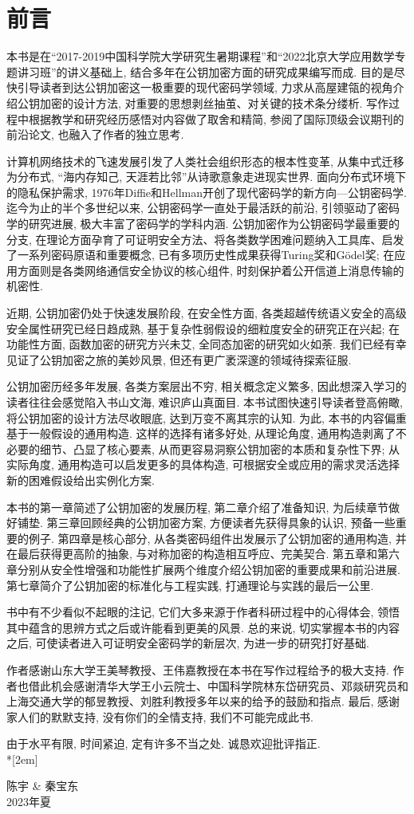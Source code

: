 \chapter{前言}
本书是在``2017-2019中国科学院大学研究生暑期课程''和``2022北京大学应用数学专题讲习班''的讲义基础上, 结合多年在公钥加密方面的研究成果编写而成. 
目的是尽快引导读者到达公钥加密这一极重要的现代密码学领域, 力求从高屋建瓴的视角介绍公钥加密的设计方法, 对重要的思想剥丝抽茧、对关键的技术条分缕析. 
写作过程中根据教学和研究经历感悟对内容做了取舍和精简, 参阅了国际顶级会议期刊的前沿论文, 也融入了作者的独立思考.   

计算机网络技术的飞速发展引发了人类社会组织形态的根本性变革, 从集中式迁移为分布式, ``海内存知己, 天涯若比邻''从诗歌意象走进现实世界. 
面向分布式环境下的隐私保护需求, 1976年Diffie和Hellman开创了现代密码学的新方向—公钥密码学. 
迄今为止的半个多世纪以来, 公钥密码学一直处于最活跃的前沿, 引领驱动了密码学的研究进展, 极大丰富了密码学的学科内涵. 
公钥加密作为公钥密码学最重要的分支, 在理论方面孕育了可证明安全方法、将各类数学困难问题纳入工具库、启发了一系列密码原语和重要概念, 
已有多项历史性成果获得Turing奖和G\"odel奖; 在应用方面则是各类网络通信安全协议的核心组件, 时刻保护着公开信道上消息传输的机密性. 

近期, 公钥加密仍处于快速发展阶段, 在安全性方面, 各类超越传统语义安全的高级安全属性研究已经日趋成熟, 基于复杂性弱假设的细粒度安全的研究正在兴起; 
在功能性方面, 函数加密的研究方兴未艾, 全同态加密的研究如火如荼. 我们已经有幸见证了公钥加密之旅的美妙风景, 但还有更广袤深邃的领域待探索征服. 

公钥加密历经多年发展, 各类方案层出不穷, 相关概念定义繁多, 因此想深入学习的读者往往会感觉陷入书山文海, 难识庐山真面目. 
本书试图快速引导读者登高俯瞰, 将公钥加密的设计方法尽收眼底, 达到万变不离其宗的认知. 
为此, 本书的内容偏重基于一般假设的通用构造. 这样的选择有诸多好处, 从理论角度, 通用构造剥离了不必要的细节、凸显了核心要素, 从而更容易洞察公钥加密的本质和复杂性下界; 
从实际角度, 通用构造可以启发更多的具体构造, 可根据安全或应用的需求灵活选择新的困难假设给出实例化方案. 

本书的第一章简述了公钥加密的发展历程, 第二章介绍了准备知识, 为后续章节做好铺垫. 
第三章回顾经典的公钥加密方案, 方便读者先获得具象的认识, 预备一些重要的例子. 
第四章是核心部分, 从各类密码组件出发展示了公钥加密的通用构造, 并在最后获得更高阶的抽象, 与对称加密的构造相互呼应、完美契合. 
第五章和第六章分别从安全性增强和功能性扩展两个维度介绍公钥加密的重要成果和前沿进展. 
第七章简介了公钥加密的标准化与工程实践, 打通理论与实践的最后一公里. 

书中有不少看似不起眼的注记, 它们大多来源于作者科研过程中的心得体会, 领悟其中蕴含的思辨方式之后或许能看到更美的风景. 
总的来说, 切实掌握本书的内容之后, 可使读者进入可证明安全密码学的新层次, 为进一步的研究打好基础. 

作者感谢山东大学王美琴教授、王伟嘉教授在本书在写作过程给予的极大支持. 
作者也借此机会感谢清华大学王小云院士、中国科学院林东岱研究员、邓燚研究员和上海交通大学的郁昱教授、刘胜利教授多年以来的给予的鼓励和指点. 
最后, 感谢家人们的默默支持, 没有你们的全情支持, 我们不可能完成此书.   

由于水平有限, 时间紧迫, 定有许多不当之处. 诚恳欢迎批评指正. \\*[2em]

\hfill 陈宇 \& 秦宝东 \\

\hfill 2023年夏  